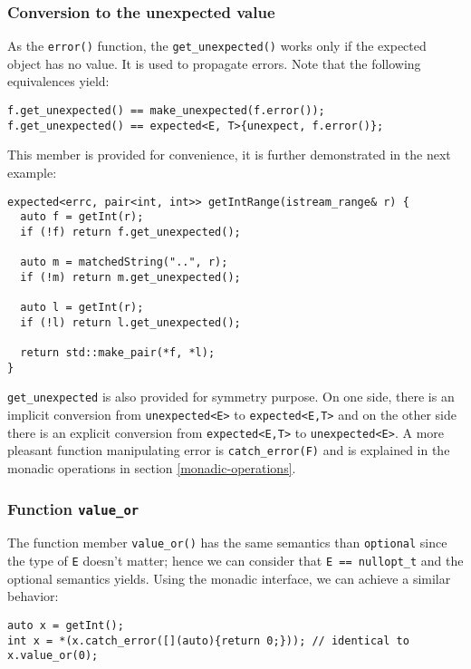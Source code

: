 \documentclass[a4paper,10pt]{article}
\newcommand{\cpp}[1]{\lstinline{#1}}
\begin{document}
\subsubsection{Conversion to the unexpected value}

As the \cpp{error()} function, the \cpp{get_unexpected()} works only if the expected object has no value. It is used to propagate errors. Note that the following equivalences yield:

\begin{lstlisting}
f.get_unexpected() == make_unexpected(f.error());
f.get_unexpected() == expected<E, T>{unexpect, f.error()};
\end{lstlisting}

\noindent
This member is provided for convenience, it is further demonstrated in the next example:

\begin{lstlisting}
expected<errc, pair<int, int>> getIntRange(istream_range& r) {
  auto f = getInt(r);
  if (!f) return f.get_unexpected();

  auto m = matchedString("..", r);
  if (!m) return m.get_unexpected();

  auto l = getInt(r);
  if (!l) return l.get_unexpected();

  return std::make_pair(*f, *l);
}
\end{lstlisting}

\cpp{get_unexpected} is also provided for symmetry purpose. On one side, there is an implicit conversion from \cpp{unexpected<E>} to \cpp{expected<E,T>} and on the other side there is an explicit conversion from \cpp{expected<E,T>} to \cpp{unexpected<E>}. A more pleasant function manipulating error is \cpp{catch_error(F)} and is explained in the monadic operations in section \ref{monadic-operations}.

\subsubsection{Function \cpp{value_or}}

The function member \cpp{value_or()} has the same semantics than \cpp{optional}\cite{OptionalRev4} since the type of \cpp{E} doesn't matter; hence we can consider that \cpp{E == nullopt_t} and the optional semantics yields. Using the monadic interface, we can achieve a similar behavior:

\begin{lstlisting}
auto x = getInt();
int x = *(x.catch_error([](auto){return 0;})); // identical to x.value_or(0);
\end{lstlisting}
\end{document}
